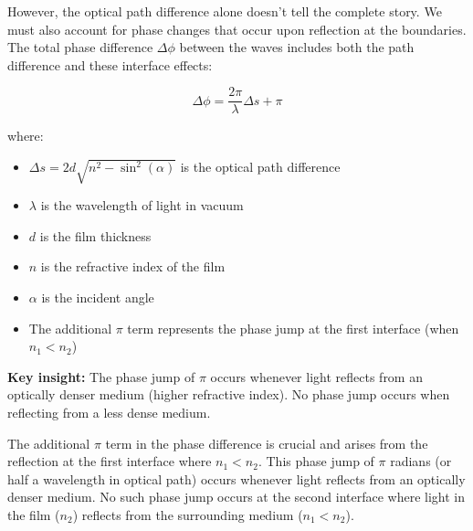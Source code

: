 \documentclass[
  a4paper,
]{book}
\providecommand{\tightlist}{%
  \setlength{\itemsep}{0pt}\setlength{\parskip}{0pt}}
\begin{document}
However, the optical path difference alone doesn't tell the complete
story. We must also account for phase changes that occur upon reflection
at the boundaries. The total phase difference \(\Delta \phi\) between
the waves includes both the path difference and these interface effects:

\begin{tcolorbox}[enhanced jigsaw, breakable, toptitle=1mm, bottomrule=.15mm, colbacktitle=quarto-callout-important-color!10!white, title=\textcolor{quarto-callout-important-color}{\faExclamation}\hspace{0.5em}{General Phase Difference Formula for Thin Films}, arc=.35mm, rightrule=.15mm, bottomtitle=1mm, opacityback=0, toprule=.15mm, coltitle=black, leftrule=.75mm, opacitybacktitle=0.6, colback=white, left=2mm, titlerule=0mm, colframe=quarto-callout-important-color-frame]

\[\Delta \phi=\frac{2\pi}{\lambda}\Delta s +\pi\]

where:

\begin{itemize}
\tightlist
\item
  \(\Delta s = 2d\sqrt{n^2-\sin^2(\alpha)}\) is the optical path
  difference
\item
  \(\lambda\) is the wavelength of light in vacuum
\item
  \(d\) is the film thickness
\item
  \(n\) is the refractive index of the film
\item
  \(\alpha\) is the incident angle
\item
  The additional \(\pi\) term represents the phase jump at the first
  interface (when \(n_1 < n_2\))
\end{itemize}

\textbf{Key insight:} The phase jump of \(\pi\) occurs whenever light
reflects from an optically denser medium (higher refractive index). No
phase jump occurs when reflecting from a less dense medium.

\end{tcolorbox}

The additional \(\pi\) term in the phase difference is crucial and
arises from the reflection at the first interface where \(n_1 < n_2\).
This phase jump of \(\pi\) radians (or half a wavelength in optical
path) occurs whenever light reflects from an optically denser medium. No
such phase jump occurs at the second interface where light in the film
(\(n_2\)) reflects from the surrounding medium (\(n_1 < n_2\)).
\end{document}

